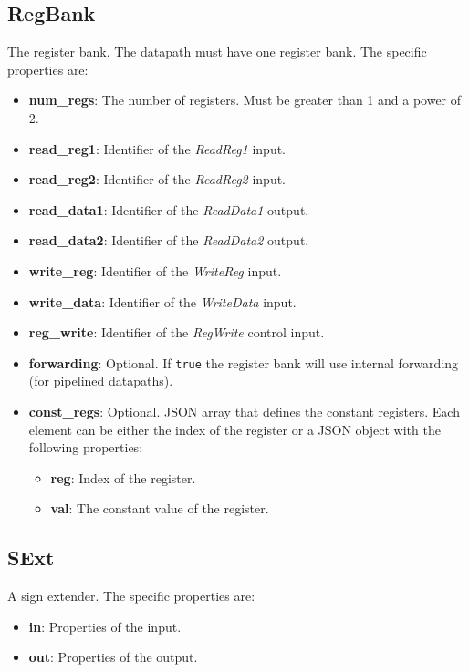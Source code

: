 \documentclass[11pt,a4paper,twoside,titlepage]{report}
\begin{document}
\subsection{RegBank}

The register bank. The datapath must have one register bank.
The specific properties are:
\begin{itemize}
	\item \textbf{num\_regs}: The number of registers. Must be greater than 1 and
		a power of 2.
	\item \textbf{read\_reg1}: Identifier of the \textit{ReadReg1} input.
	\item \textbf{read\_reg2}: Identifier of the \textit{ReadReg2} input.
	\item \textbf{read\_data1}: Identifier of the \textit{ReadData1} output.
	\item \textbf{read\_data2}: Identifier of the \textit{ReadData2} output.
	\item \textbf{write\_reg}: Identifier of the \textit{WriteReg} input.
	\item \textbf{write\_data}: Identifier of the \textit{WriteData} input.
	\item \textbf{reg\_write}: Identifier of the \textit{RegWrite} control input.
	\item \textbf{forwarding}: Optional. If \verb+true+ the register bank will use 
		internal forwarding (for pipelined datapaths).
	\item \textbf{const\_regs}: Optional. JSON array that defines the constant 
		registers. Each element can be either the index of the register or a JSON 
		object with the following properties:
		\begin{itemize}
			\item \textbf{reg}: Index of the register.
			\item \textbf{val}: The constant value of the register.
		\end{itemize}
\end{itemize}

\subsection{SExt}

A sign extender. The specific properties are:
\begin{itemize}
	\item \textbf{in}: Properties of the input.
	\item \textbf{out}: Properties of the output.
\end{itemize}
\end{document}
